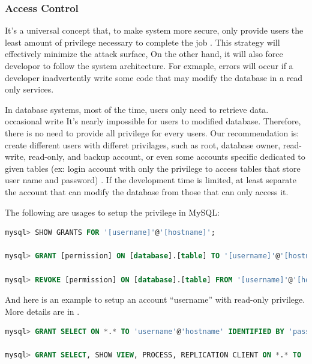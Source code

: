 \documentclass[conference]{IEEEtran}
\begin{document}
\subsubsection{Access Control}
It's a universal concept that, to make system more secure, only provide users
the least amount of privilege necessary to complete the job \cite{least_privilege}.
This strategy will effectively minimize the attack surface,
On the other hand, it will also force developor to follow the system architecture.
For exmaple, errors will occur if a developer inadvertently write some code
that may modify the database
in a read only services.

In database systems,
most of the time, users only need to retrieve data.
occasional write
It's nearly impossible for users to modified database.
Therefore, there is no need to provide all privilege
for every users.
Our recommendation is:
create different users with differet privilages,
such as root, database owner, read-write, read-only, and backup account,
or even some accounts specific dedicated to given tables (ex: login account with
only the privilege to access tables that store user name and password)
\cite{MySQL_privilage}.
If the development time is limited, at least separate the account that
can modify the database from those that can only access it.

The following are usages to setup the privilege in MySQL:
\begin{lstlisting}[language=sql]
mysql> SHOW GRANTS FOR '[username]'@'[hostname]';

mysql> GRANT [permission] ON [database].[table] TO '[username]'@'[hostname]' IDENTIFIED BY '[password]';

mysql> REVOKE [permission] ON [database].[table] FROM '[username]'@'[hostname]';
\end{lstlisting}

And here is an example to setup an account ``username'' with read-only privilege.
More details are in \cite{MySQL_privilage_detail}.
\begin{lstlisting}[language=sql]
mysql> GRANT SELECT ON *.* TO 'username'@'hostname' IDENTIFIED BY 'password';

mysql> GRANT SELECT, SHOW VIEW, PROCESS, REPLICATION CLIENT ON *.* TO ...
\end{lstlisting}
\end{document}
